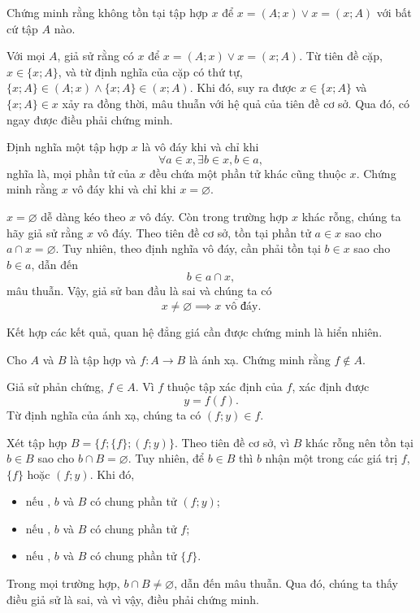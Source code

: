 \exercise Chứng minh rằng không tồn tại tập hợp $x$ để $x = (A; x) \lor x = (x; A)$ với bất cứ tập $A$ nào.

\solution

Với mọi $A$, giả sử rằng có $x$ để $x = (A; x) \lor x = (x; A)$. Từ tiên đề cặp, $x \in \{x; A\}$, và từ định nghĩa của cặp có thứ tự, $\{x; A\} \in (A; x) \land \{x; A\} \in (x; A)$. Khi đó, suy ra được $x \in \{x; A\}$ và $\{x; A\} \in x$ xảy ra đồng thời, mâu thuẫn với hệ quả của tiên đề cơ sở. Qua đó, có ngay được điều phải chứng minh.

\exercise Định nghĩa một tập hợp $x$ là vô đáy khi và chỉ khi 
\begin{equation*}
   \forall a \in x, \exists b \in x, b \in a,
\end{equation*}
nghĩa là, mọi phần tử của $x$ đều chứa một phần tử khác cũng thuộc $x$. Chứng minh rằng $x$ vô đáy khi và chỉ khi $x = \varnothing$.

\solution

$x = \varnothing$ dễ dàng kéo theo $x$ vô đáy. Còn trong trường hợp $x$ khác rỗng, chúng ta hãy giả sử rằng $x$ vô đáy. Theo tiên đề cơ sở, tồn tại phần tử $a \in x$ sao cho $a \cap x = \varnothing$. Tuy nhiên, theo định nghĩa vô đáy, cần phải tồn tại $b \in x$ sao cho $b \in a$, dẫn đến
\begin{equation*}
   b \in a \cap x,
\end{equation*}  
mâu thuẫn. Vậy, giả sử ban đầu là sai và chúng ta có
\begin{equation*}
   x \neq \varnothing \implies \overline{x\text{~vô đáy}}.
\end{equation*}

Kết hợp các kết quả, quan hệ đẳng giá cần được chứng minh là hiển nhiên.

\exercise Cho $A$ và $B$ là tập hợp và $f: A \to B$ là ánh xạ. Chứng minh rằng $f \notin A$.

\solution

Giả sử phản chứng, $f \in A$. Vì $f$ thuộc tập xác định của $f$, xác định được 
\begin{equation*}
   y = f(f).
\end{equation*}
Từ định nghĩa của ánh xạ, chúng ta có $(f; y) \in f$.

Xét tập hợp $B = \{f; \{f\}; (f; y)\}$. Theo tiên đề cơ sở, vì $B$ khác rỗng nên tồn tại $b \in B$ sao cho $b \cap B = \varnothing$. Tuy nhiên, để $b \in B$ thì $b$ nhận một trong các giá trị $f$, $\{f\}$ hoặc $(f; y)$. Khi đó,
\begin{itemize}
   \item nếu , $b$ và $B$ có chung phần tử $(f; y)$;
   \item nếu , $b$ và $B$ có chung phần tử $f$;
   \item nếu , $b$ và $B$ có chung phần tử $\{f\}$.
\end{itemize}
Trong mọi trường hợp, $b \cap B \neq \varnothing$, dẫn đến mâu thuẫn. Qua đó, chúng ta thấy điều giả sử là sai, và vì vậy, điều phải chứng minh.